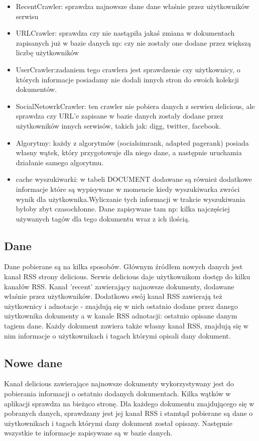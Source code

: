 \begin{itemize}
\item RecentCrawler: sprawdza najnowsze dane dane właśnie przez użytkowników serwisu
\item URLCrawler: sprawdza czy nie nastąpiła jakaś zmiana w dokumentach zapisanych już w bazie danych np: czy nie zostały one dodane przez większą liczbę użytkowników
\item UserCrawler:zadaniem tego crawlera jest sprawdzenie czy użytkownicy, o których informacje posiadamy nie dodali innych stron do swoich kolekcji dokumentów.
\item SocialNetowrkCrawler: ten crawler nie pobiera danych z serwisu delicious, ale sprawdza czy URL'e zapisane w bazie danych zostały dodane przez użytkowników innych serwisów, takich jak: digg, twitter, facebook.
\item Algorytmy: każdy z algorytmów (socialsimrank, adapted pagerank) posiada własny wątek, który przygotowuje dla niego dane, a następnie uruchamia działanie samego algorytmu.
\item  cache wyszukiwarki: w tabeli DOCUMENT dodawane są również dodatkowe informacje które są wypisywane w momencie kiedy wyszukiwarka zwróci wynik dla użytkownika.Wyliczanie tych informacji w trakcie wyszukiwania byłoby zbyt czasochłonne. Dane zapisywane tam np: kilka najczęściej używanych tagów dla tego dokumentu wraz z ich ilością.
\end{itemize}

\subsection{Dane}

Dane pobierane są na kilka sposobów. Głównym źródłem nowych danych jest kanał RSS strony delicious. Serwis delicious daje użytkownikom dostęp do kilku kanałów RSS. Kanał 'recent' zawierający najnowsze dokumenty, dodawane właśnie przez użytkowników. Dodatkowo swój kanał RSS zawierają też użytkownicy i adnotacje - znajdują się w nich ostatnio dodane przez danego użytkownika dokumenty a w kanale RSS adnotacji: ostatnio opisane danym tagiem dane. Każdy dokument zawiera także własny kanał RSS, znajdują się w nim informacje o użytkownikach i tagach którymi opisali dany dokument.

\subsection*{Nowe dane}

Kanał delicious zawierające najnowsze dokumenty wykorzystywany jest do pobierania informacji o ostatnio dodanych dokumentach. Kilka wątków w aplikacji sprawdza na bieżąco stronę. Dla każdego dokumentu znajdującego się w pobranych danych, sprawdzany jest jej kanał RSS i stamtąd pobierane są dane o użytkownikach i tagach którymi dany dokument został opisany. Następnie wszystkie te informacje zapisywane są w bazie danych.

